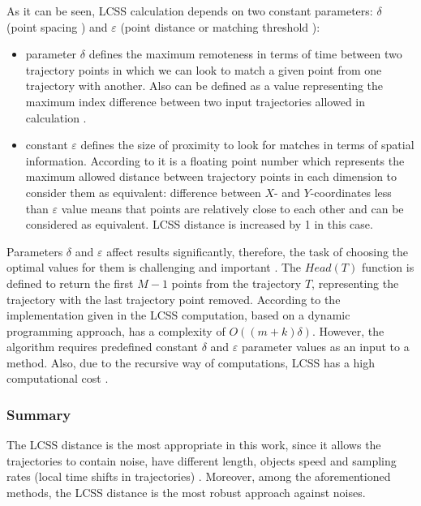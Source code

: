 As it can be seen, LCSS calculation depends on two constant parameters: $\delta$ (point spacing \cite{online:r_lcss}) and $\varepsilon$ (point distance \cite{online:r_lcss} or matching threshold \cite{article:tr_sim_meas}): 

\begin{itemize}
	\setlength\itemsep{0em}
	\item parameter $\delta$ defines the maximum remoteness in terms of time between two trajectory points in which we can look to match a given point from one trajectory with another. Also can be defined as a value representing the maximum index difference between two input trajectories allowed in calculation \cite{online:r_lcss}.
	\item constant $\varepsilon$ defines the size of proximity to look for matches in terms of spatial information. According to \cite{online:r_lcss} it is a floating point number which represents the maximum allowed distance between trajectory points in each dimension to consider them as equivalent: difference between $X$- and $Y$-coordinates less than $\varepsilon$ value means that points are relatively close to each other and can be considered as equivalent. LCSS distance is increased by 1 in this case.
\end{itemize}

Parameters $\delta$ and $\varepsilon$ affect results significantly, therefore, the task of choosing the optimal values for them is challenging and important \cite{inproceedings:7_related_work}\cite{inproceedings:28_lcss_dsmt}. The $Head(T)$ function is defined to return the first $M - 1$ points from the trajectory $T$, representing the trajectory with the last trajectory point removed. According to the implementation given in \cite{online:r_lcss} the LCSS computation, based on a dynamic programming approach, has a complexity of $O((m + k) \delta)$. However, the algorithm requires predefined constant $\delta$ and $\varepsilon$ parameter values as an input to a method. Also, due to the recursive way of computations, LCSS has a high computational cost \cite{inproceedings:comp_sim_meas_trcl}.

\subsubsection{Summary}

The LCSS distance is the most appropriate in this work, since it allows the trajectories to contain noise, have different length, objects speed and sampling rates (local time shifts in trajectories) \cite{inproceedings:7_related_work}. Moreover, among the aforementioned methods, the LCSS distance is the most robust approach against noises.


